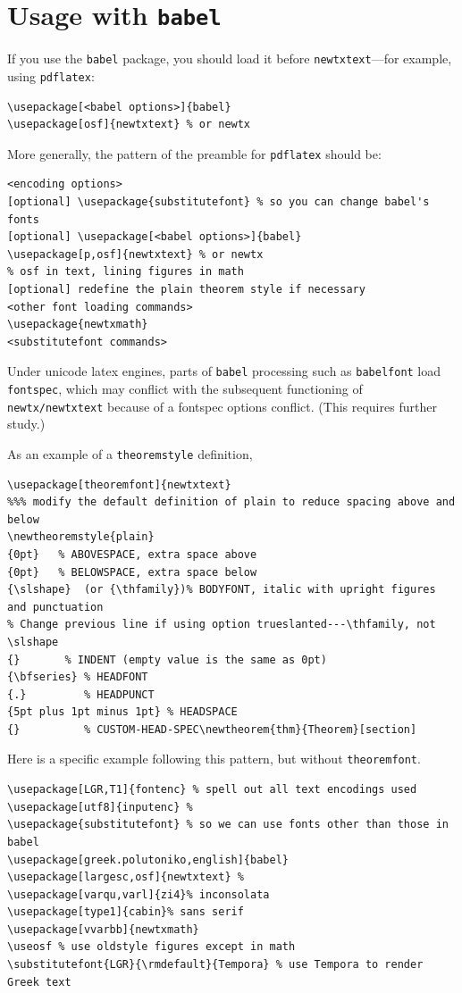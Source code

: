 \documentclass[\fsc]{article}
\theoremstyle{oldplain}
\theoremstyle{plain}
\begin{document}
\section{Usage with {\tt babel}}
If you use the {\tt babel} package, you should load it before {\tt newtxtext}---for example, using {\tt pdflatex}:
\begin{verbatim}
\usepackage[<babel options>]{babel}
\usepackage[osf]{newtxtext} % or newtx
\end{verbatim}
More generally, the pattern of the preamble for {\tt pdflatex} should be:
\begin{verbatim}
<encoding options>
[optional] \usepackage{substitutefont} % so you can change babel's fonts
[optional] \usepackage[<babel options>]{babel}
\usepackage[p,osf]{newtxtext} % or newtx
% osf in text, lining figures in math
[optional] redefine the plain theorem style if necessary
<other font loading commands>
\usepackage{newtxmath}
<substitutefont commands>
\end{verbatim}
Under unicode latex engines, parts of {\tt babel} processing such as {\tt babelfont} load {\tt fontspec}, which may conflict with the subsequent functioning of {\tt newtx/newtxtext} because of a fontspec options conflict. (This requires further study.)

As an example of a {\tt theoremstyle} definition,
\begin{verbatim}
\usepackage[theoremfont]{newtxtext}
%%% modify the default definition of plain to reduce spacing above and below
\newtheoremstyle{plain}
{0pt}   % ABOVESPACE, extra space above
{0pt}   % BELOWSPACE, extra space below
{\slshape}  (or {\thfamily})% BODYFONT, italic with upright figures and punctuation
% Change previous line if using option trueslanted---\thfamily, not \slshape
{}       % INDENT (empty value is the same as 0pt)
{\bfseries} % HEADFONT
{.}         % HEADPUNCT
{5pt plus 1pt minus 1pt} % HEADSPACE
{}          % CUSTOM-HEAD-SPEC\newtheorem{thm}{Theorem}[section]
\end{verbatim}

Here is a specific example following this pattern, but without {\tt theoremfont}.
\begin{verbatim}
\usepackage[LGR,T1]{fontenc} % spell out all text encodings used
\usepackage[utf8]{inputenc} % 
\usepackage{substitutefont} % so we can use fonts other than those in babel
\usepackage[greek.polutoniko,english]{babel}
\usepackage[largesc,osf]{newtxtext} % 
\usepackage[varqu,varl]{zi4}% inconsolata
\usepackage[type1]{cabin}% sans serif
\usepackage[vvarbb]{newtxmath}
\useosf % use oldstyle figures except in math
\substitutefont{LGR}{\rmdefault}{Tempora} % use Tempora to render Greek text
\end{verbatim}
\end{document}
